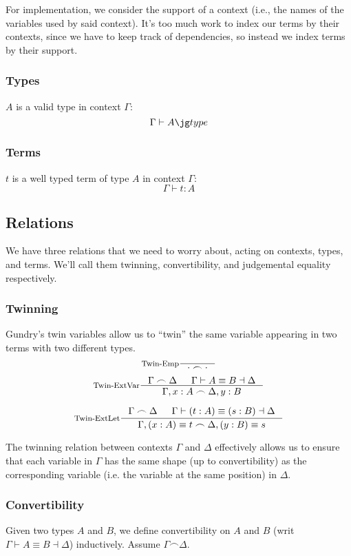 For implementation, we consider the support of a context (i.e., the names of the variables used by said context).
It's too much work to index our terms by their contexts, since we have to keep track of dependencies, so instead we index terms by their support.

\subsubsection{Types}
$A$ is a valid type in context $\Gamma$:
\[
  \Gamma \vdash \type{A}
\]

\subsubsection{Terms}
$t$ is a well typed term of type $A$ in context $\Gamma$:
\[
  \Gamma \vdash t : A
\]

\subsection{Relations}
We have three relations that we need to worry about, acting on contexts, types, and terms. We'll call them twinning, convertibility, and judgemental equality respectively.

\subsubsection{Twinning}
Gundry's twin variables \cite{gundry2013TypeInferenceHaskell} \cite{gundry2013TutorialImplementationDynamic} allow us to ``twin'' the same variable appearing in two terms with two different types.
\[
  \inference[Twin-Emp]{}{\cdot \frown \cdot}
\]
\[
  \inference[Twin-ExtVar]
    { \Gamma \frown \Delta
    & \Gamma \vdash A \equiv B \dashv \Delta
    }
    { \Gamma, x : A \frown \Delta, y : B }
\]

\[
  \inference[Twin-ExtLet]
  { \twin{\Gamma}{\Delta}
  & \Gamma \vdash (t : A) \equiv (s : B) \dashv \Delta
  }
  {\twin{\Gamma, (x : A) \equiv t}{\Delta, (y : B) \equiv s}}
\]

The twinning relation between contexts $\Gamma$ and $\Delta$ effectively allows us to ensure that each variable in $\Gamma$ has the same shape (up to convertibility) as the corresponding variable (i.e. the variable at the same position) in $\Delta$.

\subsubsection{Convertibility}
Given two types $A$ and $B$, we define convertibility on $A$ and $B$ (writ $\Gamma \vdash A \equiv B \dashv \Delta$) inductively. Assume $\Gamma \frown \Delta$.

